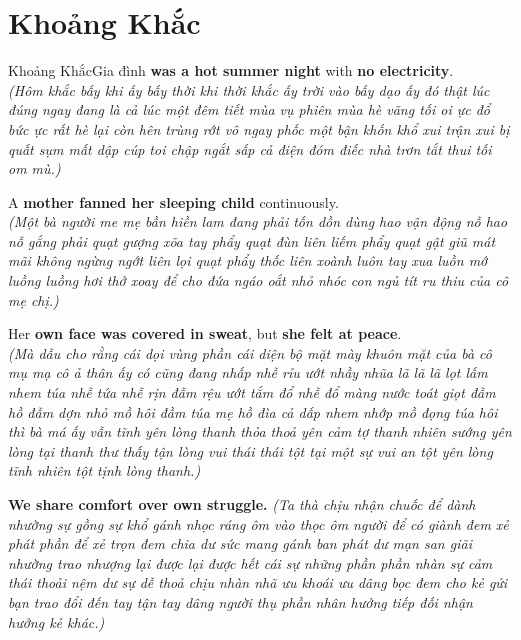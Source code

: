 \section{Khoảng Khắc}
\begin{truyen}{Khoảng Khắc}{Gia đình}
 \textbf{was a hot summer night} with \textbf{no electricity}.\\
\textit{(Hôm khắc bấy khi ấy bấy thời khi thời khắc ấy trời vào bấy dạo ấy đó thật lúc đúng ngay đang là cả lúc một đêm tiết mùa vụ phiên mùa hè vãng tối oi ực đổ bức ực rất hè lại còn hên trùng rớt vô ngay phốc một bận khốn khổ xui trận xui bị quất sụm mất dập cúp toi chập ngắt sấp cả điện đóm điếc nhà trơn tắt thui tối om mù.)}

A \textbf{mother fanned her sleeping child} continuously.\\
\textit{(Một bà người me mẹ bần hiền lam đang phải tốn dồn dùng hao vận động nỗ hao nỗ gắng phải quạt gượng xõa tay phẩy quạt đùn liên liếm phẩy quạt gật giũ mát mãi không ngừng ngớt liên lọi quạt phẩy thốc liên xoành luôn tay xua luồn mớ luồng luồng hơi thở xoay để cho đứa ngáo oắt nhỏ nhóc con ngủ tít ru thiu của cô mẹ chị.)}

Her \textbf{own face was covered in sweat}, but \textbf{she felt at peace}.\\
\textit{(Mà dẫu cho rằng cái dọi vùng phần cái diện bộ mặt mày khuôn mặt của bà cô mụ mạ cô ả thân ấy có cũng đang nhấp nhễ rỉu ướt nhầy nhũa lã lã lã lọt lấm nhem túa nhễ tứa nhễ rịn đẫm rệu ướt tắm đổ nhễ đổ màng nước toát giọt đẫm hồ đẫm dợn nhỏ mồ hôi đầm túa mẹ hồ đìa cả dấp nhem nhớp mồ đọng túa hôi thì bà má ấy vẫn tĩnh yên lòng thanh thỏa thoả yên cảm tợ thanh nhiên sướng yên lòng tại thanh thư thấy tận lòng vui thái thái tột tại một sự vui an tột yên lòng tĩnh nhiên tột tịnh lòng thanh.)}
\end{truyen}

\begin{baihoc}
  \textbf{We share comfort over own struggle.} \textit{(Ta thà chịu nhận chuốc để dành nhường sự gồng sự khổ gánh nhọc ráng ôm vào thọc ôm người để có giành đem xẻ phát phần để xẻ trọn đem chia dư sức mang gánh ban phát dư mạn san giãi nhường trao nhượng lại được lại được hết cái sự những phần phần nhàn sự cảm thái thoải nệm dư sự dễ thoả chịu nhàn nhã ưu khoái ưu dâng bọc đem cho kẻ gửi bạn trao đổi đến tay tận tay dâng người thụ phần nhân hưởng tiếp đối nhận hưởng kẻ khác.)}
\end{baihoc}

\vspace{0.8cm}

